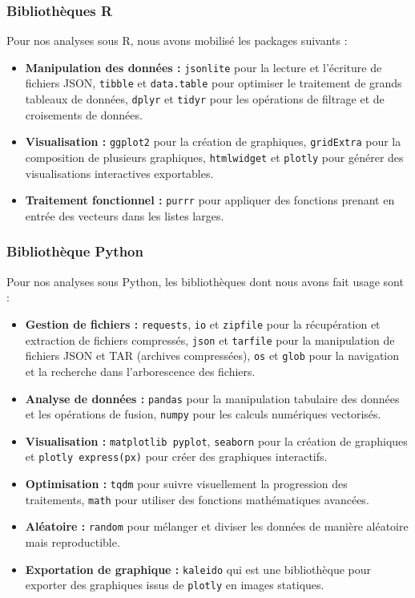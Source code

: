\documentclass[a4paper,12pt]{article}
\begin{document}
\subsubsection{Bibliothèques R}

Pour nos analyses sous R, nous avons mobilisé les packages suivants :
\begin{itemize}
    \item \textbf{Manipulation des données :} \texttt{jsonlite} pour la lecture et l'écriture de fichiers JSON, \texttt{tibble} et \texttt{data.table} pour optimiser le traitement de grands tableaux de données, \texttt{dplyr} et \texttt{tidyr} pour les opérations de filtrage et de croisements de données.
    \item \textbf{Visualisation :} \texttt{ggplot2} pour la création de graphiques, \texttt{gridExtra} pour la composition de plusieurs graphiques, \texttt{htmlwidget} et \texttt{plotly} pour générer des visualisations interactives exportables.
    \item \textbf{Traitement fonctionnel :} \texttt{purrr} pour appliquer des fonctions prenant en entrée des vecteurs dans les listes larges.
\end{itemize}

\subsubsection{Bibliothèque Python}

Pour nos analyses sous Python, les bibliothèques dont nous avons fait usage sont :
\begin{itemize}
    \item \textbf{Gestion de fichiers :} \texttt{requests}, \texttt{io}  et \texttt{zipfile} pour la récupération et extraction de fichiers compressés, \texttt{json} et \texttt{tarfile} pour la manipulation de fichiers JSON et TAR (archives compressées), \texttt{os} et \texttt{glob} pour la navigation et la recherche dans l'arborescence des fichiers.
    \item \textbf{Analyse de données :} \texttt{pandas} pour la manipulation tabulaire des données et les opérations de fusion, \texttt{numpy} pour les calculs numériques vectorisés.
    \item \textbf{Visualisation :} \texttt{matplotlib pyplot}, \texttt{seaborn} pour la création de graphiques et \texttt{plotly express(px)} pour créer des graphiques interactifs.
    \item \textbf{Optimisation :} \texttt{tqdm} pour suivre visuellement la progression des traitements, \texttt{math} pour utiliser des fonctions mathématiques avancées.
    \item \textbf{Aléatoire :} \texttt{random} pour mélanger et diviser les données de manière aléatoire mais reproductible.
    \item \textbf{Exportation de graphique :} \texttt{kaleido} qui est une bibliothèque pour exporter des graphiques issus de \texttt{plotly} en images statiques.
\end{itemize}
\end{document}
